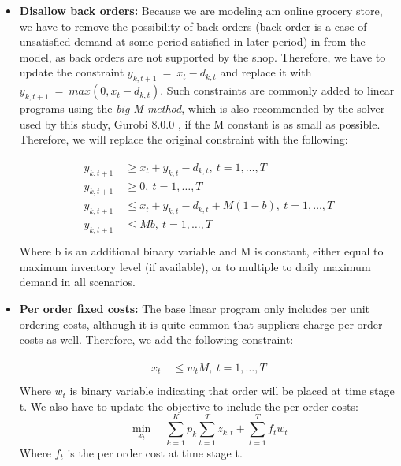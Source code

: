 \documentclass[11pt,a4paper]{article}
\begin{document}
\begin{itemize}
\item \textbf{Disallow back orders:} Because we are modeling am online grocery store, we have to remove the possibility of back orders (back order is a case of unsatisfied demand at some period satisfied in later period) in from the model, as back orders are not supported by the shop. Therefore, we have to update the constraint $y_{k,t+1}\ =\ x_t - d_{k,t}$ and replace it with $y_{k,t+1}\ =\ max(0, x_t - d_{k,t})$. Such constraints are commonly added to linear programs using the \textit{big M method}, which is also recommended by the solver used by this study, Gurobi 8.0.0 \cite{gurobi}, if the M constant is as small as possible. Therefore, we will replace the original constraint with the following:

\begin{equation}
\begin{gathered}
\begin{aligned}
 y_{k,t+1}\ &\geq x_t + y_{k,t} - d_{k,t},\  t = 1,\dots,T\\ 
  y_{k,t+1}\ &\geq 0,\  t = 1,\dots,T\\ 
   y_{k,t+1}\ &\leq x_t + y_{k,t} - d_{k,t} + M(1-b),\  t = 1,\dots,T\\  
   y_{k,t+1}\ &\leq Mb,\  t = 1,\dots,T\\ 
 \end{aligned}
\end{gathered}
\end{equation}
Where b is an additional binary variable and M is constant, either equal to maximum inventory level (if available),
or to multiple to daily maximum demand in all scenarios.

\item \textbf{Per order fixed costs:}
The base linear program only includes per unit ordering costs, although it is quite common that suppliers charge per order costs as well. Therefore, we add the following constraint:

\begin{equation}
\begin{gathered}
\begin{aligned}
 x_{t}\ &\leq w_{t}M,\  t = 1,\dots,T \\
 \end{aligned}
\end{gathered}
\end{equation}
Where $w_{t}$ is binary variable indicating that order will be placed at time stage t. We also have to update the objective to include the per order costs:
\begin{equation}
\min_{x_{t}} \quad 
\sum\limits_{k=1}^{K}{ p_k \sum\limits_{t=1}^{T}{ z_{k,t} }} + \sum\limits_{t=1}^{T}{f_{t} w_{t} }
\end{equation}
Where $f_{t}$ is the per order cost at time stage t.


\end{itemize}
\end{document}
